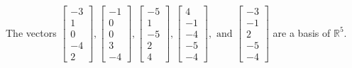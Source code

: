 \begin{exercise}
\begin{exerciseStatement}
  \end{exerciseStatement}
  \begin{exerciseAnswer}
   The vectors \(\left[\begin{array}{r}
-3 \\
1 \\
0 \\
-4 \\
2
\end{array}\right] , \left[\begin{array}{r}
-1 \\
0 \\
0 \\
3 \\
-4
\end{array}\right] , \left[\begin{array}{r}
-5 \\
1 \\
-5 \\
2 \\
4
\end{array}\right] , \left[\begin{array}{r}
4 \\
-1 \\
-4 \\
-5 \\
-4
\end{array}\right] , \text{ and } \left[\begin{array}{r}
-3 \\
-1 \\
2 \\
-5 \\
-4
\end{array}\right]\) 
  	 are  a basis of \(\mathbb{R}^5\).
  


  \end{exerciseAnswer}
\end{exercise}